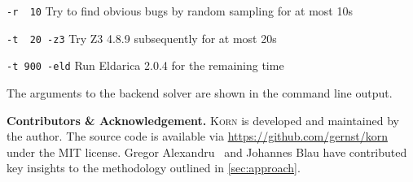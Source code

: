 \documentclass{llncs}
\newcommand{\Korn}{\textsc{Korn}\xspace}
\begin{document}
\texttt{-r~~10}
    \tabto{2.8cm} Try to find obvious bugs by random sampling for at most 10s

\texttt{-t~~20 -z3}
    \tabto{2.8cm} Try Z3 4.8.9 subsequently for at most 20s

\texttt{-t~900 -eld}
    \tabto{2.8cm} Run Eldarica 2.0.4 for the remaining time

\smallskip

\noindent
The arguments to the backend solver are shown in the command line output.

\textbf{Contributors \& Acknowledgement.}
\Korn is developed and maintained by the author.
The source code is available via \url{https://github.com/gernst/korn} under the MIT license.
Gregor Alexandru~\cite{alexandru2019} and Johannes Blau have contributed
key insights to the methodology outlined in \cref{sec:approach}.



\end{document}

